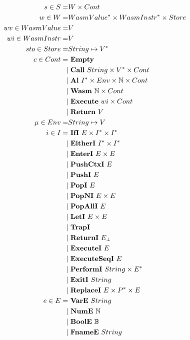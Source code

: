 
\begin{align*}
%
  s \in S =& W \times Cont \\
%
  w \in W =& \seq{WasmValue} \times \seq{WasmInstr} \times Store \\
  wv \in WasmValue =& V \\
  wi \in WasmInstr =& V \\
%
  sto \in Store =& String \mapsto \seq V \\
%
  c \in Cont =& ~ \mt \\
    | & ~ \call ~ String \times \seq V \times Cont \\
    | & ~ \al ~ \seq I \times Env \times \mathbb N \times Cont \\
    | & ~ \wasm ~ \mathbb N \times Cont \\
    | & ~ \exe ~ wi \times Cont \\
    | & ~ \ret ~ V \\
%
  \mu \in Env =& String \mapsto V \\
%
  i \in I =& ~ \ifi ~ E \times \seq I \times \seq I \\
    | & ~ \eitheri ~ \seq I \times \seq I \\
    | & ~ \enteri ~ E \times E \\
    | & ~ \pushctxi ~ E \\
    | & ~ \pushi ~ E \\
    | & ~ \popi ~ E \\
    | & ~ \popni ~ E \times E \\
    | & ~ \popalli ~ E \\
    | & ~ \leti ~ E \times E \\
    | & ~ \trapi \\
    | & ~ \returni ~ E_{\bot} \\
    | & ~ \executei ~ E \\
    | & ~ \executeseqi ~ E \\
    | & ~ \performi ~ String \times \seq{E} \\
    | & ~ \exiti ~ String \\
    | & ~ \replacei ~ E \times \seq P \times E \\
%
  e \in E =& ~ \vare ~ String \\
    | & ~ \nume ~ \mathbb N \\
    | & ~ \boole ~ \mathbb B \\
    | & ~ \fnamee ~ String \\

\end{align*}
